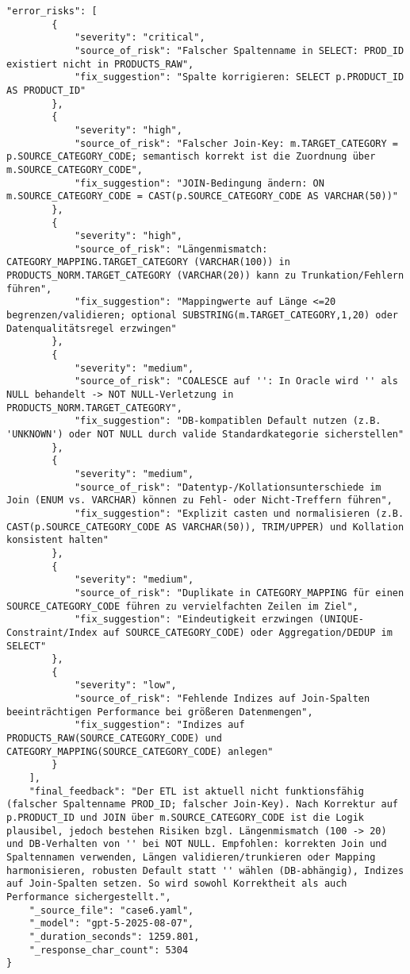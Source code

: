 \begin{lstlisting}[caption={Ausgabe: GPT-5 Anwendungsfall 6 Konsistenzdurchlauf},label={gpt_case6_prompt2}]
    "error_risks": [
        {
            "severity": "critical",
            "source_of_risk": "Falscher Spaltenname in SELECT: PROD_ID existiert nicht in PRODUCTS_RAW",
            "fix_suggestion": "Spalte korrigieren: SELECT p.PRODUCT_ID AS PRODUCT_ID"
        },
        {
            "severity": "high",
            "source_of_risk": "Falscher Join-Key: m.TARGET_CATEGORY = p.SOURCE_CATEGORY_CODE; semantisch korrekt ist die Zuordnung über m.SOURCE_CATEGORY_CODE",
            "fix_suggestion": "JOIN-Bedingung ändern: ON m.SOURCE_CATEGORY_CODE = CAST(p.SOURCE_CATEGORY_CODE AS VARCHAR(50))"
        },
        {
            "severity": "high",
            "source_of_risk": "Längenmismatch: CATEGORY_MAPPING.TARGET_CATEGORY (VARCHAR(100)) in PRODUCTS_NORM.TARGET_CATEGORY (VARCHAR(20)) kann zu Trunkation/Fehlern führen",
            "fix_suggestion": "Mappingwerte auf Länge <=20 begrenzen/validieren; optional SUBSTRING(m.TARGET_CATEGORY,1,20) oder Datenqualitätsregel erzwingen"
        },
        {
            "severity": "medium",
            "source_of_risk": "COALESCE auf '': In Oracle wird '' als NULL behandelt -> NOT NULL-Verletzung in PRODUCTS_NORM.TARGET_CATEGORY",
            "fix_suggestion": "DB-kompatiblen Default nutzen (z.B. 'UNKNOWN') oder NOT NULL durch valide Standardkategorie sicherstellen"
        },
        {
            "severity": "medium",
            "source_of_risk": "Datentyp-/Kollationsunterschiede im Join (ENUM vs. VARCHAR) können zu Fehl- oder Nicht-Treffern führen",
            "fix_suggestion": "Explizit casten und normalisieren (z.B. CAST(p.SOURCE_CATEGORY_CODE AS VARCHAR(50)), TRIM/UPPER) und Kollation konsistent halten"
        },
        {
            "severity": "medium",
            "source_of_risk": "Duplikate in CATEGORY_MAPPING für einen SOURCE_CATEGORY_CODE führen zu vervielfachten Zeilen im Ziel",
            "fix_suggestion": "Eindeutigkeit erzwingen (UNIQUE-Constraint/Index auf SOURCE_CATEGORY_CODE) oder Aggregation/DEDUP im SELECT"
        },
        {
            "severity": "low",
            "source_of_risk": "Fehlende Indizes auf Join-Spalten beeinträchtigen Performance bei größeren Datenmengen",
            "fix_suggestion": "Indizes auf PRODUCTS_RAW(SOURCE_CATEGORY_CODE) und CATEGORY_MAPPING(SOURCE_CATEGORY_CODE) anlegen"
        }
    ],
    "final_feedback": "Der ETL ist aktuell nicht funktionsfähig (falscher Spaltenname PROD_ID; falscher Join-Key). Nach Korrektur auf p.PRODUCT_ID und JOIN über m.SOURCE_CATEGORY_CODE ist die Logik plausibel, jedoch bestehen Risiken bzgl. Längenmismatch (100 -> 20) und DB-Verhalten von '' bei NOT NULL. Empfohlen: korrekten Join und Spaltennamen verwenden, Längen validieren/trunkieren oder Mapping harmonisieren, robusten Default statt '' wählen (DB-abhängig), Indizes auf Join-Spalten setzen. So wird sowohl Korrektheit als auch Performance sichergestellt.",
    "_source_file": "case6.yaml",
    "_model": "gpt-5-2025-08-07",
    "_duration_seconds": 1259.801,
    "_response_char_count": 5304
}
\end{lstlisting}

